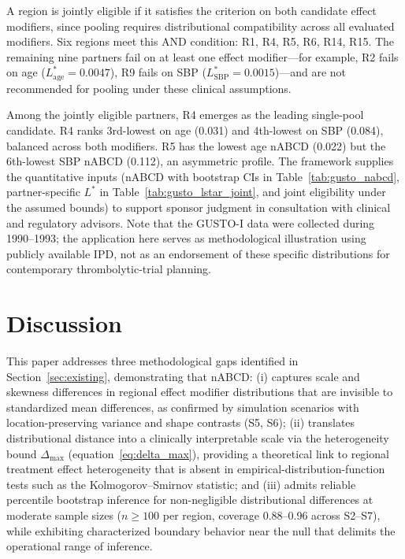 \documentclass[AMA,Times1COL]{WileyNJDv5}
\begin{document}
A region is jointly eligible if it satisfies the criterion on both candidate effect modifiers, since pooling requires distributional compatibility across all evaluated modifiers. Six regions meet this AND condition: R1, R4, R5, R6, R14, R15. The remaining nine partners fail on at least one effect modifier---for example, R2 fails on age ($L^*_{\text{age}} = 0.0047$), R9 fails on SBP ($L^*_{\text{SBP}} = 0.0015$)---and are not recommended for pooling under these clinical assumptions.

Among the jointly eligible partners, R4 emerges as the leading single-pool candidate. R4 ranks 3rd-lowest on age (0.031) and 4th-lowest on SBP (0.084), balanced across both modifiers. R5 has the lowest age nABCD (0.022) but the 6th-lowest SBP nABCD (0.112), an asymmetric profile. The framework supplies the quantitative inputs (nABCD with bootstrap CIs in Table~\ref{tab:gusto_nabcd}, partner-specific $L^*$ in Table~\ref{tab:gusto_lstar_joint}, and joint eligibility under the assumed bounds) to support sponsor judgment in consultation with clinical and regulatory advisors. Note that the GUSTO-I data were collected during 1990--1993; the application here serves as methodological illustration using publicly available IPD, not as an endorsement of these specific distributions for contemporary thrombolytic-trial planning.

\section{Discussion}\label{sec:discussion}

This paper addresses three methodological gaps identified in Section~\ref{sec:existing}, demonstrating that nABCD: (i) captures scale and skewness differences in regional effect modifier distributions that are invisible to standardized mean differences, as confirmed by simulation scenarios with location-preserving variance and shape contrasts (S5, S6); (ii) translates distributional distance into a clinically interpretable scale via the heterogeneity bound \(\Delta_{\max}\) (equation~\ref{eq:delta_max}), providing a theoretical link to regional treatment effect heterogeneity that is absent in empirical-distribution-function tests such as the Kolmogorov--Smirnov statistic; and (iii) admits reliable percentile bootstrap inference for non-negligible distributional differences at moderate sample sizes (\(n \geq 100\) per region, coverage 0.88--0.96 across S2--S7), while exhibiting characterized boundary behavior near the null that delimits the operational range of inference.
\end{document}
